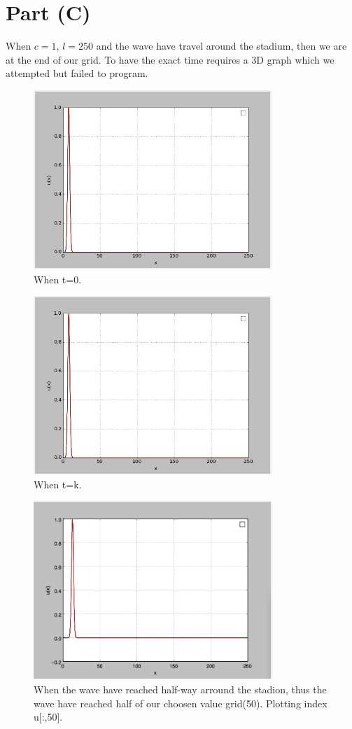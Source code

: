 \documentclass[a4paper]{article}
\begin{document}
\section*{Part (C)}
When $c=1$, $l=250$ and the wave have travel around the stadium, then we are at the end of our grid. To have the exact time requires a 3D graph which we attempted but failed to program. 
\begin{figure} [h]
\centering
\includegraphics[width=90mm]{2}
\caption{When t=0.}
\label{fig:2}
\end{figure}
\begin{figure} [h]
\centering
\includegraphics[width=90mm]{3}
\caption{When t=k.}
\label{fig:3}
\end{figure}
\begin{figure} [h]
\centering
\includegraphics[width=90mm]{4}
\caption{When the wave have reached half-way arround the stadion, thus the wave have reached half of our choosen value grid(50). Plotting index u[:,50].}
\label{fig:4}
\end{figure}
\end{document}
